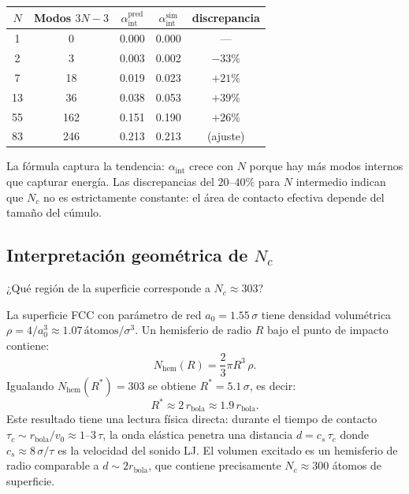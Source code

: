 \documentclass[11pt, a4paper]{article}
\begin{document}
\begin{center}
\begin{tabular}{ccccc}
  \toprule
  $N$ & Modos $3N-3$ & $\alpha_\text{int}^\text{pred}$
      & $\alpha_\text{int}^\text{sim}$ & discrepancia \\
  \midrule
   1  &    0   &  0.000  &  0.000  & --- \\
   2  &    3   &  0.003  &  0.002  & $-33\%$ \\
   7  &   18   &  0.019  &  0.023  & $+21\%$ \\
  13  &   36   &  0.038  &  0.053  & $+39\%$ \\
  55  &  162   &  0.151  &  0.190  & $+26\%$ \\
  83  &  246   &  0.213  &  0.213  & (ajuste) \\
  \bottomrule
\end{tabular}
\end{center}

La fórmula captura la tendencia: $\alpha_\text{int}$ crece con $N$ porque hay
más modos internos que capturar energía. Las discrepancias del $20$--$40\%$
para $N$ intermedio indican que $N_c$ no es estrictamente constante: el área
de contacto efectiva depende del tamaño del cúmulo.

\subsection{Interpretación geométrica de \texorpdfstring{$N_c$}{Nc}}

¿Qué región de la superficie corresponde a $N_c \approx 303$?

La superficie FCC con parámetro de red $a_0 = 1.55\,\sigma$ tiene densidad
volumétrica $\rho = 4/a_0^3 \approx 1.07\,\text{átomos}/\sigma^3$.
Un hemisferio de radio $R$ bajo el punto de impacto contiene:
\begin{equation}
  N_\text{hem}(R) = \frac{2}{3}\pi R^3\,\rho.
\end{equation}
Igualando $N_\text{hem}(R^*) = 303$ se obtiene $R^* = 5.1\,\sigma$, es decir:
\begin{equation}
  R^* \approx 2\,r_\text{bola} \approx 1.9\,r_\text{bola}.
\end{equation}
Este resultado tiene una lectura física directa: durante el tiempo de
contacto $\tau_c \sim r_\text{bola}/v_0 \approx 1$--$3\,\tau$, la onda
elástica penetra una distancia $d = c_s\,\tau_c$ donde
$c_s \approx 8\,\sigma/\tau$ es la velocidad del sonido LJ. El volumen
excitado es un hemisferio de radio comparable a $d \sim 2r_\text{bola}$,
que contiene precisamente $N_c \approx 300$ átomos de superficie.
\end{document}
